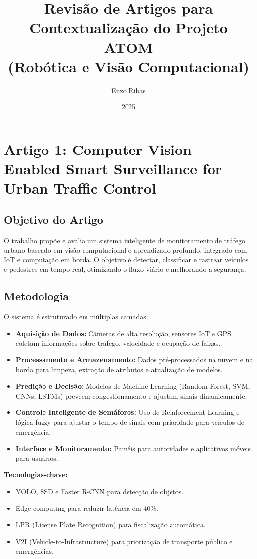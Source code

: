 \documentclass{article}
\begin{document}
\title{Revisão de Artigos para Contextualização do Projeto ATOM\\(Robótica e Visão Computacional)}
\author{Enzo Ribas}
\date{2025}

\maketitle
\section*{Artigo 1: Computer Vision Enabled Smart Surveillance for Urban Traffic Control}

\subsection*{Objetivo do Artigo}
O trabalho propõe e avalia um sistema inteligente de monitoramento de tráfego urbano baseado em visão computacional e aprendizado profundo, integrado com IoT e computação em borda. O objetivo é detectar, classificar e rastrear veículos e pedestres em tempo real, otimizando o fluxo viário e melhorando a segurança.

\subsection*{Metodologia}

O sistema é estruturado em múltiplas camadas:
\begin{itemize}
    \item \textbf{Aquisição de Dados:} Câmeras de alta resolução, sensores IoT e GPS coletam informações sobre tráfego, velocidade e ocupação de faixas.
    \item \textbf{Processamento e Armazenamento:} Dados pré-processados na nuvem e na borda para limpeza, extração de atributos e atualização de modelos.
    \item \textbf{Predição e Decisão:} Modelos de Machine Learning (Random Forest, SVM, CNNs, LSTMs) preveem congestionamento e ajustam sinais dinamicamente.
    \item \textbf{Controle Inteligente de Semáforos:} Uso de Reinforcement Learning e lógica fuzzy para ajustar o tempo de sinais com prioridade para veículos de emergência.
    \item \textbf{Interface e Monitoramento:} Painéis para autoridades e aplicativos móveis para usuários.
\end{itemize}

\textbf{Tecnologias-chave:}
\begin{itemize}
    \item YOLO, SSD e Faster R-CNN para detecção de objetos.
    \item Edge computing para reduzir latência em 40\%.
    \item LPR (License Plate Recognition) para fiscalização automática.
    \item V2I (Vehicle-to-Infrastructure) para priorização de transporte público e emergências.
\end{itemize}
\end{document}
